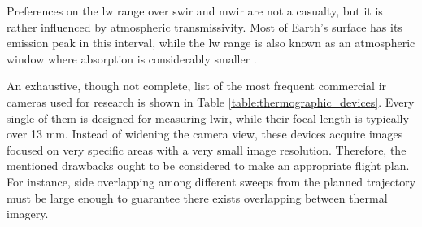 Preferences on the \acrshort{lw} range over \acrshort{swir} and \acrshort{mwir} are not a casualty, but it is rather influenced by atmospheric transmissivity. Most of Earth's surface has its emission peak in this interval, while the \acrshort{lw} range is also known as an atmospheric window where absorption is considerably smaller \cite{gonzalez_thermal_2019, quattrochi_thermal_1999}. 

An exhaustive, though not complete, list of the most frequent commercial \acrshort{ir} cameras used for research is shown in Table \ref{table:thermographic_devices}. Every single of them is designed for measuring \acrshort{lwir}, while their focal length is typically over 13 \si{\milli\meter}. Instead of widening the camera view, these devices acquire images focused on very specific areas with a very small image resolution. Therefore, the mentioned drawbacks ought to be considered to make an appropriate flight plan. For instance, side overlapping among different sweeps from the planned trajectory must be large enough to guarantee there exists overlapping between thermal imagery. 

